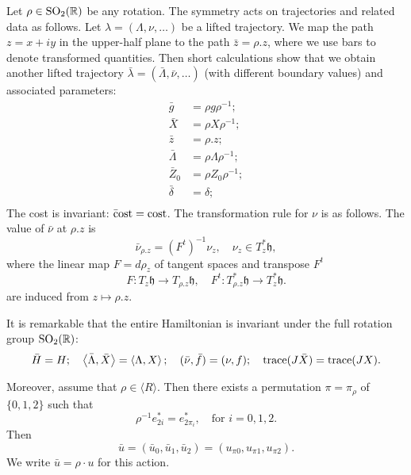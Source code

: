 \documentclass{article}
\theoremstyle{remark}
\newcommand{\ring}[1]{\mathbb{#1}}
\newcommand{\op}[1]{\hbox{#1}}
\newcommand{\ang}[1]{\left\langle{#1}\right\rangle}
\def\SO{\op{SO}_2(\ring{R})}
\def\h{\mathfrak h}
\newcommand\ee[1]{e_{#1}^*}
\begin{document}
Let $\rho\in \SO$ be any rotation.  The symmetry acts on trajectories
and related data as follows.  Let $\lambda=(\Lambda,\nu,\ldots)$ be a
lifted trajectory.  We map the path $z=x+iy$ in the upper-half plane to
the path $\bar z = \rho.z$, where we use bars to denote transformed
quantities.  Then short calculations show that we obtain another
lifted trajectory $\bar\lambda=(\bar \Lambda,\bar \nu,\ldots)$ (with
different boundary values) and associated parameters:
\begin{align*}
\bar g &= \rho g \rho^{-1};\\
\bar X &= \rho X \rho^{-1};\\
\bar z &= \rho.z;\\ 
\bar \Lambda &= \rho\Lambda \rho^{-1};\\
\bar Z_0 &= \rho Z_0 \rho^{-1};\\
\bar \delta &= \delta;\\
\end{align*}
The cost is invariant: $ {\op{\={c}ost}} = \op{cost}$.    
The transformation rule for 
$\nu$ is as follows.
The value of $\bar\nu$ at $\rho.z$ is 
\[
\bar\nu_{\rho.z} = (F^t)^{-1} \nu_z,\quad \nu_z\in T_z^*\h,
\]
where the linear map $F= d\rho_z$ of tangent spaces and transpose $F^t$
\[
F:T_z\h\to T_{\rho.z}\h,\quad F^t:T_{\rho.z}^*\h\to T_z^*\h.
\]
are induced from $z\mapsto \rho.z$.




It is remarkable that the entire Hamiltonian is invariant under the
full rotation group $\SO$:
\[
\bar H = H;\quad 
\ang{\bar\Lambda,\bar X} = \ang{\Lambda,X};\quad
(\bar \nu,\bar f)=(\nu,f);\quad
\op{trace}(J\bar X) = \op{trace}(J X).
\]

Moreover, assume that $\rho\in\langle R\rangle$. Then there exists a
permutation $\pi=\pi_\rho$ of $\{0,1,2\}$ such that
\[
\rho^{-1} \ee{2i} = \ee{2\pi_i}, \quad \text{for } i=0,1,2.
\]
Then
\begin{equation}\label{eqn:ubar}
\bar u =  (\bar u_0,\bar u_1,\bar u_2) = (u_{\pi 0},u_{\pi 1},u_{\pi 2}).
\end{equation}
We write $\bar u = \rho\cdot u$ for this action.
\end{document}
